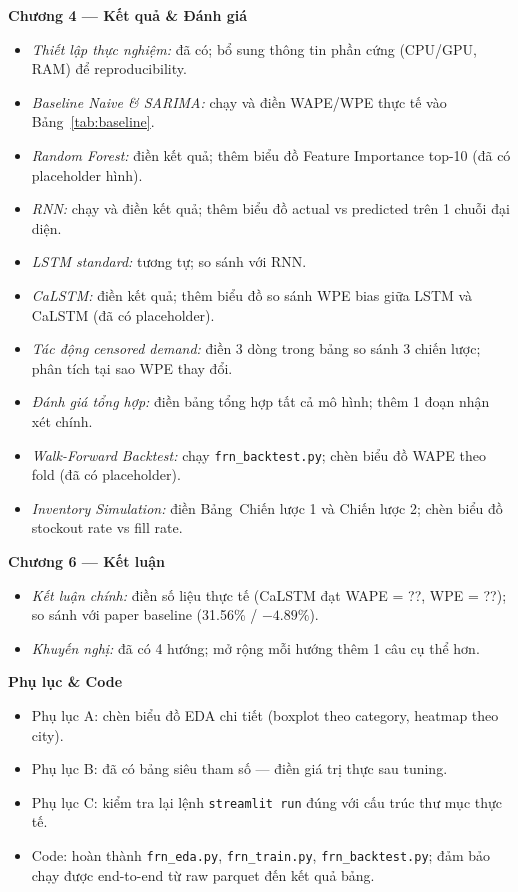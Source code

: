 \documentclass[12pt,a4paper]{report}
\newcommand{\ownerTT}{\colorbox{red!15}{\textbf{[TT] Thanh Tài}}}
\begin{document}
\begin{tcolorbox}[colback=red!4, colframe=red!55!black,
    title=\bfseries \ownerTT\ — Nhiệm vụ chi tiết (Người nắm chính)]
\medskip
\textbf{Chương 4 — Kết quả \& Đánh giá}
\begin{itemize}[leftmargin=1.5em, itemsep=1pt]
    \item[\S4.1] \textit{Thiết lập thực nghiệm:} đã có; bổ sung thông tin phần cứng (CPU/GPU, RAM) để reproducibility.
    \item[\S4.2] \textit{Baseline Naive \& SARIMA:} chạy và điền WAPE/WPE thực tế vào Bảng~\ref{tab:baseline}.
    \item[\S4.3] \textit{Random Forest:} điền kết quả; thêm biểu đồ Feature Importance top-10 (đã có placeholder hình).
    \item[\S4.4] \textit{RNN:} chạy và điền kết quả; thêm biểu đồ actual vs predicted trên 1 chuỗi đại diện.
    \item[\S4.4] \textit{LSTM standard:} tương tự; so sánh với RNN.
    \item[\S4.4] \textit{CaLSTM:} điền kết quả; thêm biểu đồ so sánh WPE bias giữa LSTM và CaLSTM (đã có placeholder).
    \item[\S4.5] \textit{Tác động censored demand:} điền 3 dòng trong bảng so sánh 3 chiến lược; phân tích tại sao WPE thay đổi.
    \item[\S4.6] \textit{Đánh giá tổng hợp:} điền bảng tổng hợp tất cả mô hình; thêm 1 đoạn nhận xét chính.
    \item[\S4.7] \textit{Walk-Forward Backtest:} chạy \texttt{frn\_backtest.py}; chèn biểu đồ WAPE theo fold (đã có placeholder).
    \item[\S4.7] \textit{Inventory Simulation:} điền Bảng~Chiến lược 1 và Chiến lược 2; chèn biểu đồ stockout rate vs fill rate.
\end{itemize}

\medskip
\textbf{Chương 6 — Kết luận}
\begin{itemize}[leftmargin=1.5em, itemsep=1pt]
    \item[\S6.1] \textit{Kết luận chính:} điền số liệu thực tế (CaLSTM đạt WAPE = ??, WPE = ??); so sánh với paper baseline (31.56\% / $-4.89\%$).
    \item[\S6.2] \textit{Khuyến nghị:} đã có 4 hướng; mở rộng mỗi hướng thêm 1 câu cụ thể hơn.
\end{itemize}

\medskip
\textbf{Phụ lục \& Code}
\begin{itemize}[leftmargin=1.5em, itemsep=1pt]
    \item Phụ lục A: chèn biểu đồ EDA chi tiết (boxplot theo category, heatmap theo city).
    \item Phụ lục B: đã có bảng siêu tham số --- điền giá trị thực sau tuning.
    \item Phụ lục C: kiểm tra lại lệnh \texttt{streamlit run} đúng với cấu trúc thư mục thực tế.
    \item Code: hoàn thành \texttt{frn\_eda.py}, \texttt{frn\_train.py}, \texttt{frn\_backtest.py}; đảm bảo chạy được end-to-end từ raw parquet đến kết quả bảng.
\end{itemize}

\end{tcolorbox}
\end{document}
